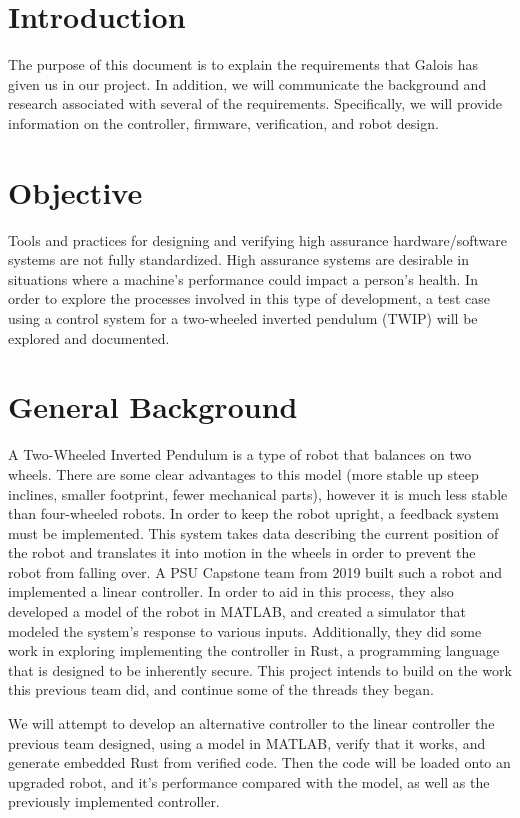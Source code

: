 \documentclass[a4paper,12pt]{article}
\begin{document}
\newpage
{}

\section{Introduction}
	The purpose of this document is to explain the requirements that Galois has given us in our project. In addition, we will communicate the background and research associated with several of the requirements. Specifically, we will provide information on the controller, firmware, verification, and robot design.
	
\section{Objective}
	Tools and practices for designing and verifying high assurance hardware/software systems are not fully standardized. High assurance systems are desirable in situations where a machine's performance could impact a person's health. In order to explore the processes involved in this type of development, a test case using a control system for a two-wheeled inverted pendulum (TWIP) will be explored and documented.
	
\section{General Background}
	A Two-Wheeled Inverted Pendulum is a type of robot that balances on two wheels. There are some clear advantages to this model (more stable up steep inclines, smaller footprint, fewer mechanical parts), however it is much less stable than four-wheeled robots. In order to keep the robot upright, a feedback system must be implemented. This system takes data describing the current position of the robot and translates it into motion in the wheels in order to prevent the robot from falling over. A PSU Capstone team from 2019 built such a robot and implemented a linear controller. In order to aid in this process, they also developed a model of the robot in MATLAB, and created a simulator that modeled the system's response to various inputs. Additionally, they did some work in exploring implementing the controller in Rust, a programming language that is designed to be inherently secure. This project intends to build on the work this previous team did, and continue some of the threads they began. 
	
	We will attempt to develop an alternative controller to the linear controller the previous team designed, using a model in MATLAB, verify that it works, and generate embedded Rust from verified code. Then the code will be loaded onto an upgraded robot, and it's performance compared with the model, as well as the previously implemented controller.
	
\end{document}
